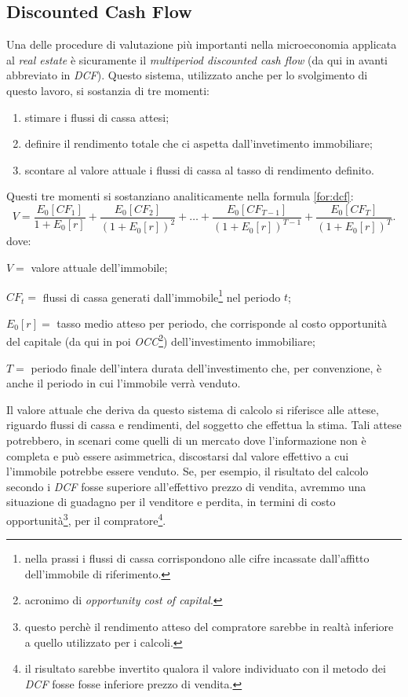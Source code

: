 \subsection{Discounted Cash Flow}
\label{subs:dcf}
Una delle procedure di valutazione più importanti nella microeconomia applicata al {\itshape real estate} è sicuramente il {\itshape multiperiod discounted cash flow} (da qui in avanti abbreviato in {\itshape DCF}). Questo sistema, utilizzato anche per lo svolgimento di questo lavoro, si sostanzia di tre momenti:
\begin{enumerate}
\item stimare i flussi di cassa attesi;
\item definire il rendimento totale che ci aspetta dall'invetimento immobiliare;
\item scontare al valore attuale i flussi di cassa al tasso di rendimento definito.
\end{enumerate}
Questi tre momenti si sostanziano analiticamente nella formula \ref{for:dcf}:
\begin{equation}
V = \frac{E_0[CF_1]}{1+E_0[r]} + \frac{E_0[CF_2]}{(1+E_0[r])^2} + \ldots + \frac{E_0[CF_{T-1}]}{(1+E_0[r])^{T-1}} + \frac{E_0[CF_T]}{(1+E_0[r])^T}.
\label{for:dcf}
\end{equation}
dove:
\begin{description}
\item $ V = $ valore attuale dell'immobile;
\item $ CF_{t} = $ flussi di cassa generati dall'immobile\footnote{nella prassi i flussi di cassa corrispondono alle cifre incassate dall'affitto dell'immobile di riferimento.} nel periodo $ t $;
\item $ E_0[r] = $ tasso medio atteso per periodo, che corrisponde al costo opportunità del capitale (da qui in poi \textit{OCC}\footnote{acronimo di {\itshape opportunity cost of capital}.}) dell'investimento immobiliare;
\item $ T = $ periodo finale dell'intera durata dell'investimento che, per convenzione, è anche il periodo in cui l'immobile verrà venduto.
\end{description}
Il valore attuale che deriva da questo sistema di calcolo si riferisce alle attese, riguardo flussi di cassa e rendimenti, del soggetto che effettua la stima. Tali attese potrebbero, in scenari come quelli di un mercato dove l'informazione non è completa e può essere asimmetrica, discostarsi dal valore effettivo a cui l'immobile potrebbe essere venduto. Se, per esempio, il risultato del calcolo secondo i \textit{DCF} fosse superiore all'effettivo prezzo di vendita, avremmo una situazione di guadagno per il venditore e perdita, in termini di costo opportunità\footnote{questo perchè il rendimento atteso del compratore sarebbe in realtà inferiore a quello utilizzato per i calcoli.}, per il compratore\footnote{il risultato sarebbe invertito qualora il valore individuato con il metodo dei \textit{DCF} fosse fosse inferiore prezzo di vendita.}.

